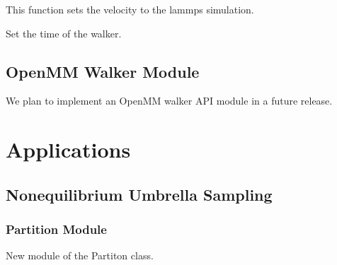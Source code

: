 \documentclass[letterpaper,10pt,english]{sphinxmanual}
\begin{document}
\begin{fulllineitems}
\begin{fulllineitems}
\end{fulllineitems}


\begin{fulllineitems}
\label{walker_api/walker_api.doc:lammpsWalker.lammpsWalker.setVel}
This function sets the velocity to the lammps simulation.

\end{fulllineitems}


\begin{fulllineitems}
\label{walker_api/walker_api.doc:lammpsWalker.lammpsWalker.set_time}
Set the time of the walker.

\end{fulllineitems}


\end{fulllineitems}



\section{OpenMM Walker Module}
\label{walker_api/walker_api.doc:openmm-walker-module}
We plan to implement an OpenMM walker API module in a future release.


\chapter{Applications}
\label{applications/applications.doc:applications}\label{applications/applications.doc::doc}

\section{Nonequilibrium Umbrella Sampling}
\label{applications/applications.doc:nonequilibrium-umbrella-sampling}

\subsection{Partition Module}
\label{applications/applications.doc:module-partition}\label{applications/applications.doc:partition-module}
New module of the Partiton class.
\end{document}
